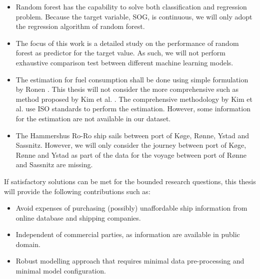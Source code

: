 \begin{itemize}
    \item Random forest has the capability to solve both classification and regression problem. Because the target variable, SOG, is continuous, we will only adopt the regression algorithm of random forest.
    \item The focus of this work is a detailed study on the performance of random forest as predictor for the target value. As such, we will not perform exhaustive comparison test between different machine learning models.
    \item The estimation for fuel consumption shall be done using simple formulation by Ronen \cite{Ronen.1982,Ronen.2011}. This thesis will not consider the more comprehensive such as method proposed by Kim et al. \cite{Kim.2020}. The comprehensive methodology by Kim et al. \cite{Kim.2020} use ISO standards to perform the estimation. However, some information for the estimation are not available in our dataset. 
    \item The Hammershus Ro-Ro ship sails between port of K{\o}ge, R{\o}nne, Ystad and Sassnitz. However, we will only consider the journey between port of K{\o}ge, R{\o}nne and Ystad as part of the data for the voyage between port of R{\o}nne and Sassnitz are missing. 
\end{itemize}

If satisfactory solutions can be met for the bounded research questions, this thesis will provide the following contributions such as: 

\begin{itemize}
    \item Avoid expenses of purchasing (possibly) unaffordable ship information from online database and shipping companies. 
    \item Independent of commercial parties, as information are available in public domain.
    \item Robust modelling approach that requires minimal data pre-processing and minimal model configuration.   
\end{itemize}






 







